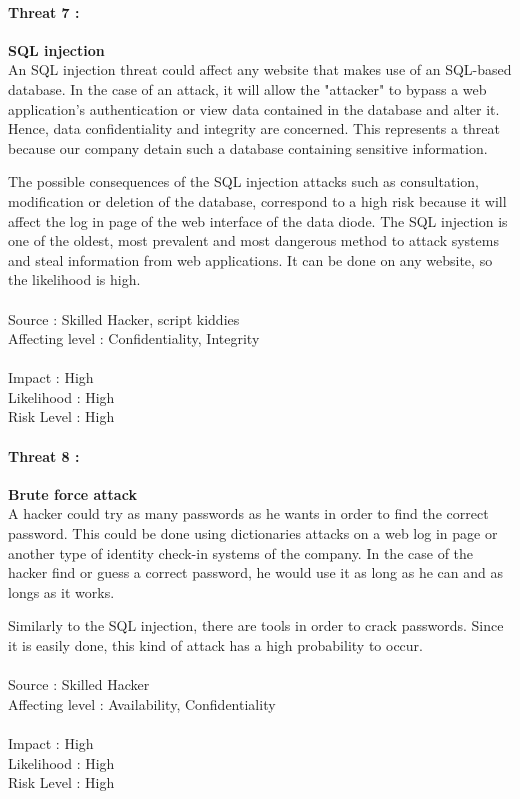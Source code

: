 \documentclass[a4paper,10pt]{article}
\begin{document}
\paragraph{Threat 7 :}  \textbf{SQL injection} \\
\indent An SQL injection threat could affect any website that makes use of an SQL-based database.
In the case of an attack, it will allow the "attacker" to bypass a web application's authentication or view data contained in the database and alter it. Hence, data confidentiality and integrity are concerned. This represents a threat because our company detain such a database containing sensitive information.

The possible consequences of the SQL injection attacks such as consultation, modification or deletion of the database, correspond to a high risk because it will affect the log in page of the web interface of the data diode. The SQL injection is one of the oldest, most prevalent and most dangerous method to attack systems and steal information from web applications. It can be done on any website, so the likelihood is high.\\ \\
Source : Skilled Hacker, script kiddies \\ 
Affecting level : Confidentiality, Integrity \\ \\
Impact : High \\
Likelihood : High \\
Risk Level : High

\paragraph{Threat 8 :}  \textbf{Brute force attack} \\
\indent A hacker could try as many passwords as he wants in order to find the correct password. This could be done using dictionaries attacks on a web log in page or another type of identity check-in systems of the company. In the case of the hacker find or guess a correct password, he would use it as long as he can and as longs as it works.

Similarly to the SQL injection, there are tools in order to crack passwords. Since it is easily done, this kind of attack has a high probability to occur. \\ \\
Source : Skilled Hacker \\ 
Affecting level : Availability, Confidentiality \\ \\
Impact : High \\
Likelihood : High \\
Risk Level : High
\end{document}
